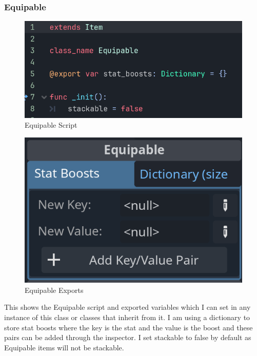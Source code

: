 \documentclass{article}
\begin{document}
        \subsubsection{Equipable}
        \begin{multicols}{2}
                \begin{figure}[H]
                        \centering
                        \includegraphics[width = 0.9\columnwidth]{images/development/Equipable_script.PNG}
                        \caption{Equipable Script}
                \end{figure}
                \begin{figure}[H]
                        \centering
                        \includegraphics[width = 0.9\columnwidth]{images/development/Equipable_export.PNG}
                        \caption{Equipable Exports}
                \end{figure}
        \end{multicols}
        \[\]
        This shows the Equipable script and exported variables which I can set in any instance of this class or classes that inherit from it. I am using a dictionary to store stat boosts where the key is the stat and the value is the boost and these pairs can be added through the inspector. I set stackable to false by default as Equipable items will not be stackable.
\end{document}
